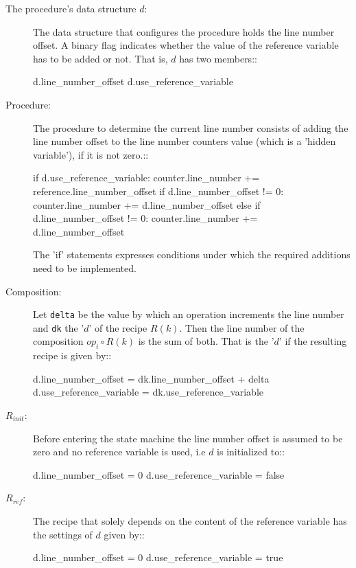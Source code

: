 \documentclass[12pt,a4paper]{scrartcl}
\begin{document}
\begin{description}
    \item[The procedure's data structure $d$:] The data structure that configures
        the procedure holds the line number offset. A binary flag indicates whether
        the value of the reference variable has to be added or not. That is, $d$
        has two members::

                d.line_number_offset
                d.use_reference_variable
        
    \item[Procedure:] The procedure to determine the current line number
        consists of adding the line number offset to the line number
        counters value (which is a 'hidden variable'), if it is not zero.::

               if d.use_reference_variable:
                   counter.line_number += reference.line_number_offset 
                   if d.line_number_offset != 0:
                       counter.line_number += d.line_number_offset 
               else if d.line_number_offset != 0:
                   counter.line_number += d.line_number_offset

        The 'if' statements expresses conditions under which the required
        additions need to be implemented.

   \item[Composition:] Let \verb/delta/ be the value by which an operation increments
       the line number and \verb/dk/ the '$d$' of the recipe $R(k)$.
       Then the line number of the composition $op_i\circ R(k)$ is the sum of
       both. That is the '$d$' if the resulting recipe is given by::

                 d.line_number_offset     = dk.line_number_offset + delta
                 d.use_reference_variable = dk.use_reference_variable

   \item[$R_{init}$:] Before entering the state machine the line number offset
        is assumed to be zero and no reference variable is used, i.e $d$ is
        initialized to::

                d.line_number_offset     = 0
                d.use_reference_variable = false

   \item[$R_{ref}$:] The recipe that solely depends on the content of the
       reference variable has the settings of $d$ given by::

                d.line_number_offset     = 0
                d.use_reference_variable = true

\end{description}
\end{document}
